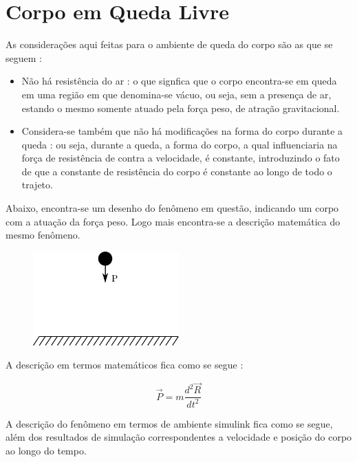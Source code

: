 \documentclass[DIV=calc, paper=a4, fontsize=11pt, twocolumn]{scrartcl}	 %
\begin{document}

\section*{Corpo em Queda Livre}
As considerações aqui feitas para o ambiente de queda do corpo são as que se seguem :

\begin{itemize}
 \item Não há resistência do ar : o que signfica que o corpo encontra-se em queda em uma região em que denomina-se vácuo, ou seja, sem a presença de ar, estando
 o mesmo somente atuado pela força peso, de atração gravitacional.
 \item Considera-se também que não há modificações na forma do corpo durante a queda : ou seja, durante a queda, a forma do corpo, a qual influenciaria na força de resistência
 de contra a velocidade, é constante, introduzindo o fato de que a constante de resistência do corpo é constante ao longo de todo o trajeto.
\end{itemize}

Abaixo, encontra-se um desenho do fenômeno em questão, indicando um corpo com a atuação da força peso. Logo mais encontra-se a descrição matemática do mesmo fenômeno.

\begin{figure}[h!]
\centering
\includegraphics[width=0.5\textwidth]{queda_livre}
\label{fig:queda_livre}
\end{figure}

\newpage

A descrição em termos matemáticos fica como se segue :

\begin{equation}
 \vec{P}=m\frac{d^2\vec{R}}{dt^2}
\end{equation}

A descrição do fenômeno em termos de ambiente simulink fica como se segue, além dos resultados de simulação correspondentes a velocidade e posição do corpo ao
longo do tempo.
\end{document}
